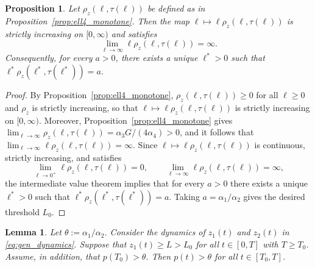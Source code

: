 \documentclass{article}
\newtheorem{lemma}{Lemma}
\newtheorem{proposition}{Proposition}
\begin{document}
\begin{proposition}\label{prop:Lell4_threshold}
Let $\rho_z(\ell,\tau(\ell))$ be defined as in Proposition~\ref{prop:ell4_monotone}. Then the map 
$\ell\mapsto \ell\rho_z(\ell,\tau(\ell))$ is strictly increasing 
on $[0,\infty)$ and satisfies
\begin{equation*}
    \lim_{\ell\to\infty}\ell\rho_z(\ell,\tau(\ell))=\infty.
\end{equation*}
Consequently, for every $a>0$, there exists a unique $\ell^*>0$ such that 
$\ell^*\rho_z(\ell^*,\tau(\ell^*))=a$.
\end{proposition}

\begin{proof}
By Proposition~\ref{prop:ell4_monotone}, $\rho_z(\ell,\tau(\ell))\ge0$ 
for all $\ell\ge0$ and $\rho_z$ is strictly increasing, so that 
$\ell\mapsto\ell\rho_z(\ell,\tau(\ell))$ is strictly increasing 
on $[0,\infty)$. Moreover, Proposition~\ref{prop:ell4_monotone} gives 
$\lim_{\ell\to\infty}\rho_z(\ell,\tau(\ell))=\alpha_3G/(4\alpha_4)>0$, 
and it follows that $\lim_{\ell\to\infty}\ell\rho_z(\ell,\tau(\ell))
=\infty$. Since $\ell\mapsto\ell\rho_z(\ell,\tau(\ell))$ is 
continuous, strictly increasing, and satisfies
\begin{equation*}
    \lim_{\ell\to 0^+}\ell\rho_z(\ell,\tau(\ell))=0,
    \qquad
    \lim_{\ell\to\infty}\ell\rho_z(\ell,\tau(\ell))=\infty,
\end{equation*}
the intermediate value theorem implies that for every $a>0$ there exists 
a unique $\ell^*>0$ such that $\ell^*\rho_z(\ell^*,\tau(\ell^*))=a$.
Taking $a=\alpha_1/\alpha_2$ gives the desired threshold $L_0$.
\end{proof}

\begin{lemma}\label{lem:p_above_theta}
    Let $\theta:=\alpha_1/\alpha_2$. Consider the dynamics of $z_1(t)$ and $z_2(t)$ in \eqref{eq:gen_dynamics}. Suppose that $z_1(t)\ge L>L_0$ for all $t\in[0,T]$ with $T\ge T_0$. Assume, in addition, that $p(T_0)>\theta$. Then $p(t)>\theta$ for all $t\in[T_0,T]$.
\end{lemma}
\end{document}
